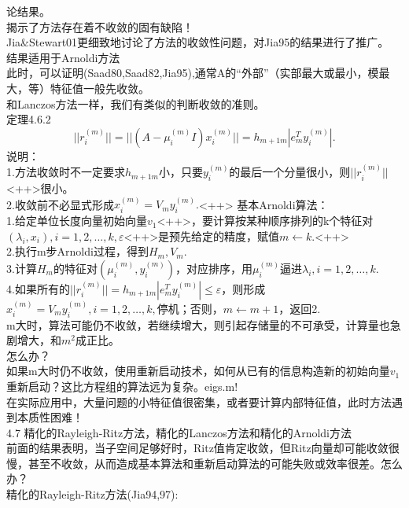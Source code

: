 \documentclass[a4paper,12pt]{article}
\begin{document}
\begin{CJK*}{UTF8}{gbsn}
	论结果。\\
	揭示了方法存在着不收敛的固有缺陷！\\
	Jia&Stewart01更细致地讨论了方法的收敛性问题，对Jia95的结果进行了推广。\\
	结果适用于Arnoldi方法\\
	此时，可以证明(Saad80,Saad82,Jia95),通常A的“外部”（实部最大或最小，模最大，等）特征值一般先收敛。\\
	和Lanczos方法一样，我们有类似的判断收敛的准则。\\
	定理4.6.2\\
	\begin{equation}
		||r_i^{(m)}|| = ||(A-\mu_i^{(m)}I)x_i^{(m)}|| = h_{m+1m}|e_m^Ty_i^{(m)}|.
	\end{equation}
	说明：\\
	1.方法收敛时不一定要求$h_{m+1m}$小，只要$y_i^{(m)}$的最后一个分量很小，则$||r_i^{(m)}||$<++>很小。\\
	2.收敛前不必显式形成$x_i^{(m)}=V_my_i^{(m)}.$<++>
	基本Arnoldi算法：\\
	1.给定单位长度向量初始向量$v_1$<++>，要计算按某种顺序排列的k个特征对$(\lambda_i,x_i),i=1,2,\ldots,k,\varepsilon$<++>是预先给定的精度，赋值$m\leftarrow k.$<++>\\
	2.执行m步Arnoldi过程，得到$H_m,V_m.$\\
	3.计算$H_m$的特征对$(\mu_i^{(m)},y_i^{(m)})$，对应排序，用$\mu_i^{(m)}$逼进$\lambda_i,i=1,2,\ldots,k.$\\
	4.如果所有的$||r_i^{(m)}|| = h_{m+1m}|e_m^Ty_i^{(m)}|\le \varepsilon$，则形成$x_i^{(m)} = V_my_i^{(m)},i=1,2,\ldots,k,$停机；否则，$m\leftarrow m+1$，返回2.\\
	m大时，算法可能仍不收敛，若继续增大，则引起存储量的不可承受，计算量也急剧增大，和$m^2$成正比。\\
	怎么办？\\
	如果m大时仍不收敛，使用重新启动技术，如何从已有的信息构造新的初始向量$v_1$重新启动？这比方程组的算法远为复杂。eigs.m!\\
	在实际应用中，大量问题的小特征值很密集，或者要计算内部特征值，此时方法遇到本质性困难！\\
	4.7 精化的Rayleigh-Ritz方法，精化的Lanczos方法和精化的Arnoldi方法\\
	前面的结果表明，当子空间足够好时，Ritz值肯定收敛，但Ritz向量却可能收敛很慢，甚至不收敛，从而造成基本算法和重新启动算法的可能失败或效率很差。怎么办？\\
	精化的Rayleigh-Ritz方法(Jia94,97):\\

\end{CJK*}
\end{document}
